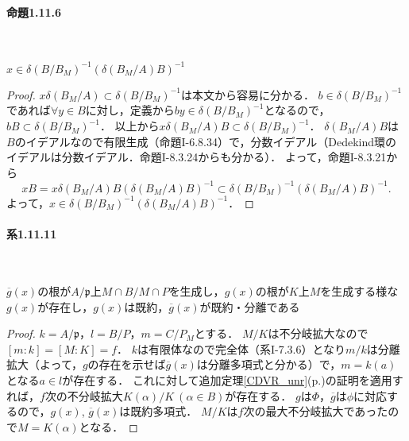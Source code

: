 \paragraph{命題1.11.6}~
\begin{screen}
  $x\in\delta(B/B_M)^{-1}(\delta(B_M/A)B)^{-1}$
\end{screen}
\begin{proof}
  $x\delta(B_M/A)\subset\delta(B/B_M)^{-1}$は本文から容易に分かる．
  $b\in\delta(B/B_M)^{-1}$であれば$\forall y\in B$に対し，定義から$by\in\delta(B/B_M)^{-1}$となるので，$bB\subset\delta(B/B_M)^{-1}$．
  以上から$x\delta(B_M/A)B\subset\delta(B/B_M)^{-1}$．
  $\delta(B_M/A)B$は$B$のイデアルなので有限生成（命題I-6.8.34）で，分数イデアル（Dedekind環のイデアルは分数イデアル．命題I-8.3.24からも分かる）．
  よって，命題I-8.3.21から
  \[xB=x\delta(B_M/A)B(\delta(B_M/A)B)^{-1}\subset\delta(B/B_M)^{-1}(\delta(B_M/A)B)^{-1}.\]
  よって，$x\in\delta(B/B_M)^{-1}(\delta(B_M/A)B)^{-1}$．
\end{proof}

\paragraph{系1.11.11}~
\begin{screen}
  $\overline{g}(x)$の根が$A/\mathfrak{p}$上$M\cap B/M\cap P$を生成し，$g(x)$の根が$K$上$M$を生成する様な$g(x)$が存在し，$g(x)$は既約，$\overline{g}(x)$が既約・分離である
\end{screen}
\begin{proof}
  $k=A/\mathfrak{p}$，$l=B/P$，$m=C/P_M$とする．
  $M/K$は不分岐拡大なので$[m:k]=[M:K]=f$．
  $k$は有限体なので完全体（系I-7.3.6）となり$m/k$は分離拡大（よって，$g$の存在を示せば$\overline{g}(x)$は分離多項式と分かる）で，$m=k(a)$となる$a\in l$が存在する．
  これに対して追加定理\ref{CDVR_unr}(p.\pageref{CDVR_unr})の証明を適用すれば，$f$次の不分岐拡大$K(\alpha)/K\ (\alpha\in B)$が存在する．
  $g$は$\Phi$，$\overline{g}$は$\phi$に対応するので，$g(x)$, $\overline{g}(x)$は既約多項式．
  $M/K$は$f$次の最大不分岐拡大であったので$M=K(\alpha)$となる．
\end{proof}

